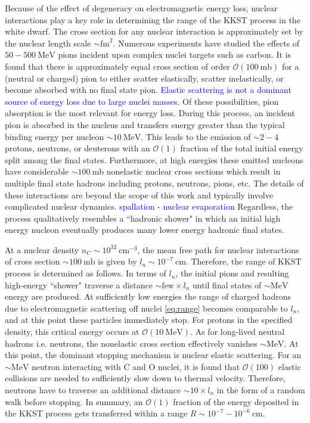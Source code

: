 \documentclass[11 pt, preprint,preprintnumbers,amsmath,amssymb, prd]{revtex4}
\newcommand{\OO}{\mathcal{O}}
\begin{document}
Because of the effect of degeneracy on electromagnetic energy loss, nuclear interactions play a key role in determining the range of the KKST process in the white dwarf. The cross section for any nuclear interaction is approximately set by the nuclear length scale $\sim \text{fm}^2$. Numerous experiments have studied the effects of $50 - 500 ~\text{MeV}$ pions incident upon complex nuclei targets such as carbon. It is found that there is approximately equal cross section of order $\OO(100 ~\text{mb})$ for a (neutral or charged) pion to either scatter elastically, scatter inelastically, or become absorbed with no final state pion. \textcolor{blue}{Elastic scattering is not a dominant source of energy loss due to large nuclei masses.} Of these possibilities, pion absorption is the most relevant for energy loss. During this process, an incident pion is absorbed in the nucleus and transfers energy greater than the typical binding energy per nucleon $\sim 10 ~\text{MeV}$. This leads to the emission of $\sim 2-4$ protons, neutrons, or deuterons with an $\OO(1)$ fraction of the total initial energy split among the final states. Furthermore, at high energies these emitted nucleons have considerable $\sim 100 ~\text{mb}$ nonelastic nuclear cross sections which result in multiple final state hadrons including protons, neutrons, pions, etc. The details of these interactions are beyond the scope of this work and typically involve complicated nuclear dynamics. \textcolor{blue}{spallation - nuclear evaporation} Regardless, the process qualitatively resembles a ``hadronic shower" in which an initial high energy nucleon eventually produces many lower energy hadronic final states.

At a nuclear density $n_C \sim 10^{32} ~\text{cm}^{-3}$, the mean free path for nuclear interactions of cross section $\sim 100 ~\text{mb}$ is given by $l_n \sim 10^{-7} ~\text{cm}$. Therefore, the range of KKST process is determined as follows. In terms of $l_n$, the initial pions and resulting high-energy ``shower" traverse a distance $\sim \text{few} \times l_n$ until final states of $\sim \text{MeV}$ energy are produced. At sufficiently low energies the range of charged hadrons due to electromagnetic scattering off nuclei \eqref{eq:range} becomes comparable to $l_n$, and at this point these particles immediately stop. For protons in the specified density, this critical energy occurs at $\OO(10 ~\text{MeV})$. As for long-lived neutral hadrons i.e. neutrons, the nonelastic cross section effectively vanishes $\sim \text{MeV}$. At this point, the dominant stopping mechanism is nuclear elastic scattering. For an $\sim \text{MeV}$ neutron interacting with C and O nuclei, it is found that $\OO(100)$ elastic collisions are needed to sufficiently slow down to thermal velocity. Therefore, neutrons have to traverse an additional distance $\sim 10 \times l_n$ in the form of a random walk before stopping. In summary, an $\OO(1)$ fraction of the energy deposited in the KKST process gets transferred within a range $R \sim 10^{-7} - 10^{-6} ~\text{cm}$.  
\end{document}
